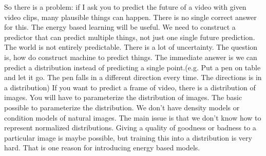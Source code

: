 \documentclass{article}
\begin{document}
So there is a problem: if I ask you to predict the future of a video with given video clips, many plausible things can happen. There is no single correct answer for this. The energy based learning will be useful. We need to construct a predictor that can predict multiple things, not just one single future prediction. The world is not entirely predictable. There is a lot of uncertainty. The question is, how do construct machine to predict things. The immediate answer is we can predict a distribution instead of predicting a single point.(e.g. Put a pen on table and let it go. The pen falls in a different direction every time. The directions is in a distribution) If you want to predict a frame of video, there is a distribution of images. You will have to parameterize the distribution of images. The basic possible to parameterize the distribution. We don't have density models or condition models of natural images. The main issue is that we don't know how to represent normalized distributions. Giving a quality of goodness or badness to a particular image is maybe possible, but training this into a distribution is very hard. That is one reason for introducing energy based models.
\end{document}
